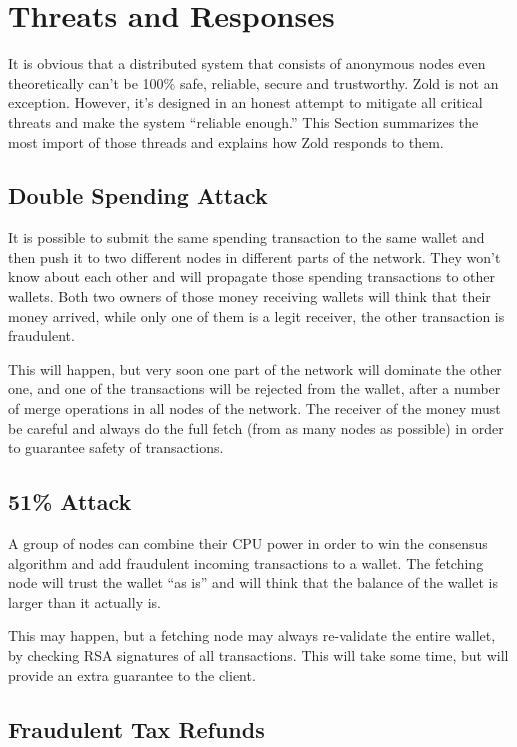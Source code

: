 \documentclass[11pt,oneside]{article}
\begin{document}
\section{Threats and Responses}\label{sec:threats}

It is obvious that a distributed system that consists of anonymous nodes
even theoretically can't be 100\% safe, reliable, secure and trustworthy.
Zold is not an exception. However, it's designed in an honest attempt
to mitigate all critical threats and make the system ``reliable enough.''
This Section summarizes the most import of those threads and explains
how Zold responds to them.

\subsection{Double Spending Attack}

It is possible to submit the same spending transaction to the same wallet
and then push it to two different nodes in different parts of the network.
They won't know about each other and will propagate those spending
transactions to other wallets. Both two owners of those money receiving
wallets will think that their money arrived, while only one of them is
a legit receiver, the other transaction is fraudulent.

This will happen, but very soon one part of the network will dominate the other
one, and one of the transactions will be rejected from the wallet, after
a number of merge operations in all nodes of the network. The receiver of the
money must be careful and always do the full fetch (from as many nodes
as possible) in order to guarantee safety of transactions.

\subsection{51\% Attack}

A group of nodes can combine their CPU power in order to win the consensus
algorithm and add fraudulent incoming transactions to a wallet.
The fetching node will trust the wallet ``as is'' and will think that the
balance of the wallet is larger than it actually is.

This may happen, but a fetching node may always re-validate the entire wallet,
by checking RSA signatures of all transactions. This will take some time, but will
provide an extra guarantee to the client.

\subsection{Fraudulent Tax Refunds}
\end{document}
